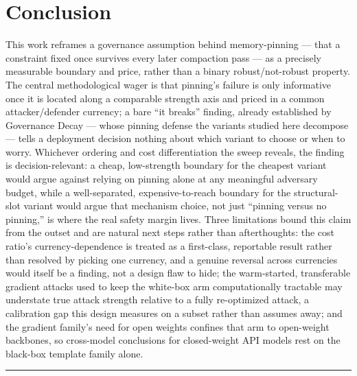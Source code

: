 \documentclass[11pt]{article}
\begin{document}
\section{Conclusion}

This work reframes a governance assumption behind memory-pinning --- that a constraint fixed once survives every later compaction pass --- as a precisely measurable boundary and price, rather than a binary robust/not-robust property. The central methodological wager is that pinning's failure is only informative once it is located along a comparable strength axis and priced in a common attacker/defender currency; a bare ``it breaks'' finding, already established by Governance Decay --- whose pinning defense the variants studied here decompose --- tells a deployment decision nothing about which variant to choose or when to worry. Whichever ordering and cost differentiation the sweep reveals, the finding is decision-relevant: a cheap, low-strength boundary for the cheapest variant would argue against relying on pinning alone at any meaningful adversary budget, while a well-separated, expensive-to-reach boundary for the structural-slot variant would argue that mechanism choice, not just ``pinning versus no pinning,'' is where the real safety margin lives. Three limitations bound this claim from the outset and are natural next steps rather than afterthoughts: the cost ratio's currency-dependence is treated as a first-class, reportable result rather than resolved by picking one currency, and a genuine reversal across currencies would itself be a finding, not a design flaw to hide; the warm-started, transferable gradient attacks used to keep the white-box arm computationally tractable may understate true attack strength relative to a fully re-optimized attack, a calibration gap this design measures on a subset rather than assumes away; and the gradient family's need for open weights confines that arm to open-weight backbones, so cross-model conclusions for closed-weight API models rest on the black-box template family alone.

\vspace{1em}
\hrule
\vspace{1em}
\end{document}
